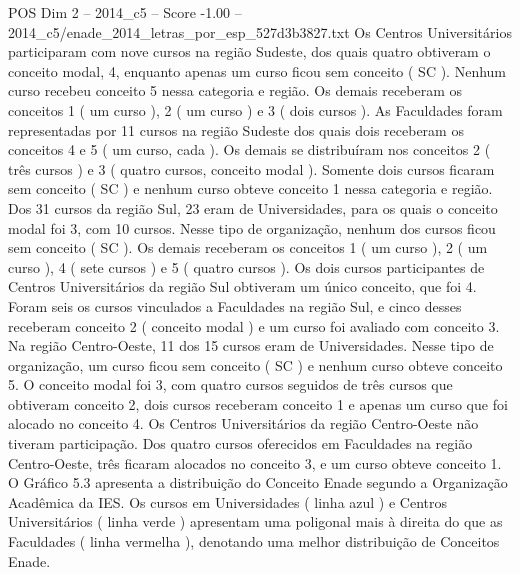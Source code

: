 \begin{textsample}{POS Dim 2 – 2014\_c5 – Score -1.00 – 2014\_c5/enade\_2014\_letras\_por\_esp\_527d3b3827.txt}
Os Centros Universitários participaram com nove cursos na região Sudeste, dos quais quatro obtiveram o conceito modal, 4, enquanto apenas um curso ficou sem conceito ( SC ).
Nenhum curso recebeu conceito 5 nessa categoria e região.
Os demais receberam os conceitos 1 ( um curso ), 2 ( um curso ) e 3 ( dois cursos ).
As Faculdades foram representadas por 11 cursos na região Sudeste dos quais dois receberam os conceitos 4 e 5 ( um curso, cada ).
Os demais se distribuíram nos conceitos 2 ( três cursos ) e 3 ( quatro cursos, conceito modal ).
Somente dois cursos ficaram sem conceito ( SC ) e nenhum curso obteve conceito 1 nessa categoria e região.
Dos 31 cursos da região Sul, 23 eram de Universidades, para os quais o conceito modal foi 3, com 10 cursos.
Nesse tipo de organização, nenhum dos cursos ficou sem conceito ( SC ).
Os demais receberam os conceitos 1 ( um curso ), 2 ( um curso ), 4 ( sete cursos ) e 5 ( quatro cursos ).
Os dois cursos participantes de Centros Universitários da região Sul obtiveram um único conceito, que foi 4.
Foram seis os cursos vinculados a Faculdades na região Sul, e cinco desses receberam conceito 2 ( conceito modal ) e um curso foi avaliado com conceito 3.
Na região Centro-Oeste, 11 dos 15 cursos eram de Universidades.
Nesse tipo de organização, um curso ficou sem conceito ( SC ) e nenhum curso obteve conceito 5.
O conceito modal foi 3, com quatro cursos seguidos de três cursos que obtiveram conceito 2, dois cursos receberam conceito 1 e apenas um curso que foi alocado no conceito 4.
Os Centros Universitários da região Centro-Oeste não tiveram participação.
Dos quatro cursos oferecidos em Faculdades na região Centro-Oeste, três ficaram alocados no conceito 3, e um curso obteve conceito 1.
O Gráfico 5.3 apresenta a distribuição do Conceito Enade segundo a Organização Acadêmica da IES.
Os cursos em Universidades ( linha azul ) e Centros Universitários ( linha verde ) apresentam uma poligonal mais à direita do que as Faculdades ( linha vermelha ), denotando uma melhor distribuição de Conceitos Enade.

\end{textsample}
